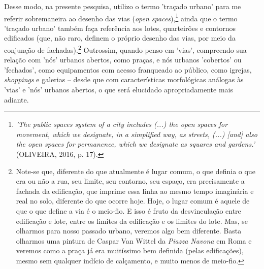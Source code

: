 \documentclass[twoside, 12pt, english,italian,latin,greek,french,spanish,brazil]{book}
\begin{document}

    Desse modo, na presente pesquisa, utilizo o termo 'traçado urbano' para me referir sobremaneira ao desenho das vias (\textit{open spaces}),\footnote[3]{\textit{'The public spaces system of a city includes (...) the open spaces for movement, which we designate, in a simplified way, as streets, (...) [and] also the open spaces for permanence, which we designate as squares and gardens.'} (OLIVEIRA, 2016, p. 17).} ainda que o termo 'traçado urbano' também faça referência aos lotes, quarteirões e contornos edificados (que, não raro, definem o próprio desenho das vias, por meio da conjunção de fachadas).\footnote[4]{Note-se que, diferente do que atualmente é lugar comum, o que definia o que era ou não a rua, seu limite, seu contorno, seu espaço, era precisamente a fachada da edificação, que imprime essa linha ao mesmo tempo imaginária e real no solo, diferente do que ocorre hoje. Hoje, o lugar comum é aquele de que o que define a via é o meio-fio. E isso é fruto da desvinculação entre edificação e lote, entre os limites da edificação e os limites do lote. Mas, se olharmos para nosso passado urbano, veremos algo bem diferente. Basta olharmos uma pintura de Caspar Van Wittel da \textit{Piazza Navona} em Roma e veremos como a praça já era muitíssimo bem definida (pelas edificações), mesmo sem qualquer indício de calçamento, e muito menos de meio-fio.} Outrossim, quando penso em 'vias', compreendo sua relação com 'nós' urbanos abertos, como praças, e nós urbanos 'cobertos' ou 'fechados', como equipamentos com acesso franqueado ao público, como igrejas, \textit{shoppings} e galerias – desde que com características morfológicas análogas às 'vias' e 'nós' urbanos abertos, o que será elucidado apropriadamente mais adiante. %
\end{document}
